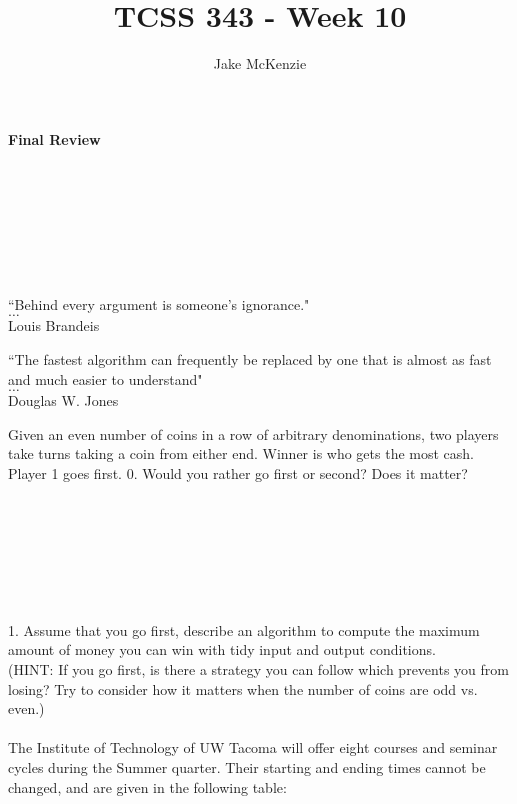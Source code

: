 \documentclass[12pt]{article}
\begin{document}
\title{TCSS 343 - Week 10}
\author{Jake McKenzie}
\maketitle
\noindent\centerline{\textbf{Final Review}}\\\\\\\\\\\\
\begin{center}
    ``Behind every argument is someone's ignorance." \\$\dots$\\ Louis Brandeis
\end{center}
\begin{center}
    ``The fastest algorithm can frequently be replaced by one that is almost as fast and much easier to understand" \\$\dots$\\ Douglas W. Jones
\end{center}
\newpage
\newpage
Given an even number of coins in a row of arbitrary denominations, two players take turns taking a coin from either end. 
Winner is who gets the most cash. Player 1 goes first. 
0. Would you rather go first or second? Does it matter?\\\\\\\\\\\\\\\\
1. Assume that you go first, describe an algorithm to compute the maximum amount of money you can win 
with tidy input and output conditions.\\
(HINT: If you go first, is there a strategy you can follow which prevents you from losing? 
Try to consider how it matters when the number of coins are odd vs. even.)\\\\
\newpage
The Institute of Technology of UW Tacoma will offer eight courses and seminar cycles 
during the Summer quarter. Their starting and ending times cannot be changed, and are 
given in the following table:\\
\begin{table}[]
\end{table}
\end{document}
